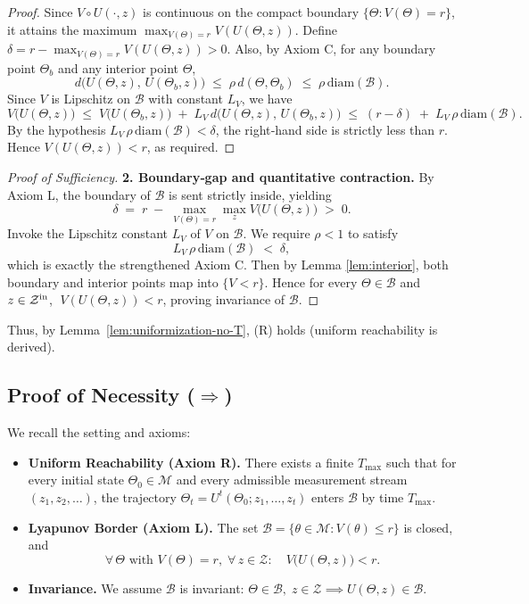 \documentclass[12pt]{article}
\theoremstyle{definition}
\theoremstyle{plain}
\begin{document}
\begin{proof}
Since \(V\circ U(\cdot,z)\) is continuous on the compact boundary
\(\{\Theta:V(\Theta)=r\}\), it attains the maximum
\(\max_{V(\Theta)=r}V(U(\Theta,z))\).  Define
\(\delta = r - \max_{V(\Theta)=r}V(U(\Theta,z))>0\).  Also, by Axiom C,
for any boundary point \(\Theta_b\) and any interior point \(\Theta\),
\[
d\bigl(U(\Theta,z),\,U(\Theta_b,z)\bigr)
\;\le\;
\rho\,d(\Theta,\Theta_b)
\;\le\;
\rho\,\mathrm{diam}(\mathcal B).
\]
Since \(V\) is Lipschitz on \(\mathcal B\) with constant \(L_V\), we have
\[
V\bigl(U(\Theta,z)\bigr)
\;\le\;
V\bigl(U(\Theta_b,z)\bigr)
\;+\;
L_V\,d\bigl(U(\Theta,z),\,U(\Theta_b,z)\bigr)
\;\le\;
(r-\delta)
\;+\;
L_V\,\rho\,\mathrm{diam}(\mathcal B).
\]
By the hypothesis \(L_V\,\rho\,\mathrm{diam}(\mathcal B)<\delta\), the
right‐hand side is strictly less than \(r\).  Hence
\(V(U(\Theta,z))<r\), as required.
\end{proof}

\begin{proof}[Proof of Sufficiency]
\textbf{2. Boundary‐gap and quantitative contraction.}
By Axiom L, the boundary of \(\mathcal B\) is sent strictly inside, yielding
\[
\delta \;=\;
r \;-\;\max_{V(\Theta)=r}\max_{z}V\bigl(U(\Theta,z)\bigr)
\;>\;0.
\]
Invoke the Lipschitz constant \(L_V\) of \(V\) on \(\mathcal B\).  We require
\(\rho<1\) to satisfy
\[
L_V\,\rho\,\mathrm{diam}(\mathcal B)\;<\;\delta,
\]
which is exactly the strengthened Axiom C.  Then by 
Lemma \ref{lem:interior}, both boundary and interior points map into
\(\{V<r\}\).  Hence for every \(\Theta\in\mathcal B\) and \(z\in\mathcal Z^{\rm in}\),
\(\;V(U(\Theta,z))<r\), proving invariance of \(\mathcal B\).

\end{proof}

Thus, by Lemma~\ref{lem:uniformization-no-T}, (R) holds (uniform reachability is derived).


\subsection{Proof of Necessity ($\Rightarrow$)}

We recall the setting and axioms:

\begin{itemize}
  \item \textbf{Uniform Reachability (Axiom R).}  There exists a finite \(T_{\max}\) such that
    for every initial state \(\Theta_0\in\mathcal M\) and every admissible measurement
    stream \((z_1,z_2,\dots)\), the trajectory
    \(\Theta_t=U^t(\Theta_0;z_1,\dots,z_t)\) enters \(\mathcal B\) by time \(T_{\max}\).
  \item \textbf{Lyapunov Border (Axiom L).}  The set
    \(\displaystyle \mathcal B = \{\theta\in\mathcal M:V(\theta)\le r\}\)
    is closed, and
    \[
      \forall\,\Theta\text{ with }V(\Theta)=r,\;\forall\,z\in\mathcal Z:
      \quad V\bigl(U(\Theta,z)\bigr)<r.
    \]
  \item \textbf{Invariance.}  We assume \(\mathcal B\) is invariant:
    \(\Theta\in\mathcal B,\;z\in\mathcal Z\implies U(\Theta,z)\in\mathcal B\).
\end{itemize}
\end{document}
